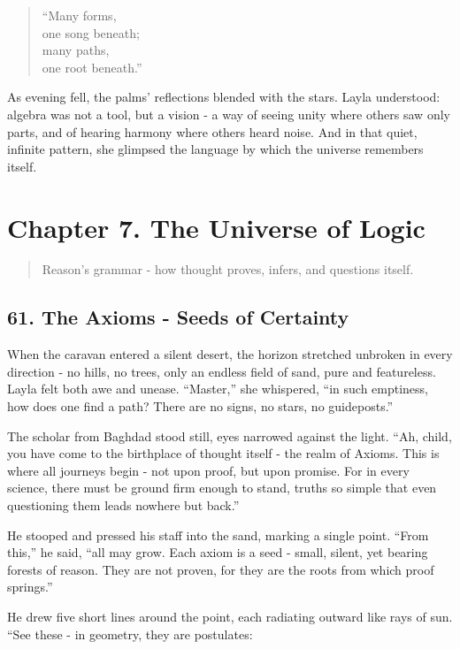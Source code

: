 \documentclass[
  letterpaper,
  DIV=11,
  numbers=noendperiod]{scrreprt}
\begin{document}
\begin{quote}
``Many forms,\\
one song beneath;\\
many paths,\\
one root beneath.''
\end{quote}

As evening fell, the palms' reflections blended with the stars. Layla
understood: algebra was not a tool, but a vision - a way of seeing unity
where others saw only parts, and of hearing harmony where others heard
noise. And in that quiet, infinite pattern, she glimpsed the language by
which the universe remembers itself.

\section{Chapter 7. The Universe of
Logic}\label{chapter-7.-the-universe-of-logic}

\begin{quote}
Reason's grammar - how thought proves, infers, and questions itself.
\end{quote}

\subsection{61. The Axioms - Seeds of
Certainty}\label{the-axioms---seeds-of-certainty}

When the caravan entered a silent desert, the horizon stretched unbroken
in every direction - no hills, no trees, only an endless field of sand,
pure and featureless. Layla felt both awe and unease. ``Master,'' she
whispered, ``in such emptiness, how does one find a path? There are no
signs, no stars, no guideposts.''

The scholar from Baghdad stood still, eyes narrowed against the light.
``Ah, child, you have come to the birthplace of thought itself - the
realm of Axioms. This is where all journeys begin - not upon proof, but
upon promise. For in every science, there must be ground firm enough to
stand, truths so simple that even questioning them leads nowhere but
back.''

He stooped and pressed his staff into the sand, marking a single point.
``From this,'' he said, ``all may grow. Each axiom is a seed - small,
silent, yet bearing forests of reason. They are not proven, for they are
the roots from which proof springs.''

He drew five short lines around the point, each radiating outward like
rays of sun. ``See these - in geometry, they are postulates:
\end{document}
